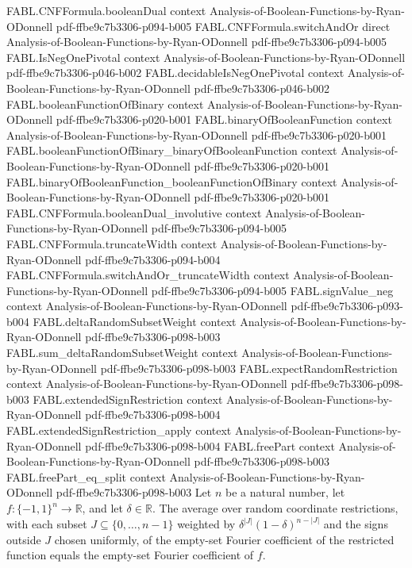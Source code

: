 \begin{theorem}
\proofstep
  {FABL.CNFFormula.booleanDual}
  {context}
  {Analysis-of-Boolean-Functions-by-Ryan-ODonnell}
  {pdf-ffbe9c7b3306-p094-b005}
\proofstep
  {FABL.CNFFormula.switchAndOr}
  {direct}
  {Analysis-of-Boolean-Functions-by-Ryan-ODonnell}
  {pdf-ffbe9c7b3306-p094-b005}
\proofstep
  {FABL.IsNegOnePivotal}
  {context}
  {Analysis-of-Boolean-Functions-by-Ryan-ODonnell}
  {pdf-ffbe9c7b3306-p046-b002}
\proofstep
  {FABL.decidableIsNegOnePivotal}
  {context}
  {Analysis-of-Boolean-Functions-by-Ryan-ODonnell}
  {pdf-ffbe9c7b3306-p046-b002}
\proofstep
  {FABL.booleanFunctionOfBinary}
  {context}
  {Analysis-of-Boolean-Functions-by-Ryan-ODonnell}
  {pdf-ffbe9c7b3306-p020-b001}
\proofstep
  {FABL.binaryOfBooleanFunction}
  {context}
  {Analysis-of-Boolean-Functions-by-Ryan-ODonnell}
  {pdf-ffbe9c7b3306-p020-b001}
\proofstep
  {FABL.booleanFunctionOfBinary_binaryOfBooleanFunction}
  {context}
  {Analysis-of-Boolean-Functions-by-Ryan-ODonnell}
  {pdf-ffbe9c7b3306-p020-b001}
\proofstep
  {FABL.binaryOfBooleanFunction_booleanFunctionOfBinary}
  {context}
  {Analysis-of-Boolean-Functions-by-Ryan-ODonnell}
  {pdf-ffbe9c7b3306-p020-b001}
\proofstep
  {FABL.CNFFormula.booleanDual_involutive}
  {context}
  {Analysis-of-Boolean-Functions-by-Ryan-ODonnell}
  {pdf-ffbe9c7b3306-p094-b005}
\proofstep
  {FABL.CNFFormula.truncateWidth}
  {context}
  {Analysis-of-Boolean-Functions-by-Ryan-ODonnell}
  {pdf-ffbe9c7b3306-p094-b004}
\proofstep
  {FABL.CNFFormula.switchAndOr_truncateWidth}
  {context}
  {Analysis-of-Boolean-Functions-by-Ryan-ODonnell}
  {pdf-ffbe9c7b3306-p094-b005}
\proofstep
  {FABL.signValue_neg}
  {context}
  {Analysis-of-Boolean-Functions-by-Ryan-ODonnell}
  {pdf-ffbe9c7b3306-p093-b004}
\proofstep
  {FABL.deltaRandomSubsetWeight}
  {context}
  {Analysis-of-Boolean-Functions-by-Ryan-ODonnell}
  {pdf-ffbe9c7b3306-p098-b003}
\proofstep
  {FABL.sum_deltaRandomSubsetWeight}
  {context}
  {Analysis-of-Boolean-Functions-by-Ryan-ODonnell}
  {pdf-ffbe9c7b3306-p098-b003}
\proofstep
  {FABL.expectRandomRestriction}
  {context}
  {Analysis-of-Boolean-Functions-by-Ryan-ODonnell}
  {pdf-ffbe9c7b3306-p098-b003}
\proofstep
  {FABL.extendedSignRestriction}
  {context}
  {Analysis-of-Boolean-Functions-by-Ryan-ODonnell}
  {pdf-ffbe9c7b3306-p098-b004}
\proofstep
  {FABL.extendedSignRestriction_apply}
  {context}
  {Analysis-of-Boolean-Functions-by-Ryan-ODonnell}
  {pdf-ffbe9c7b3306-p098-b004}
\proofstep
  {FABL.freePart}
  {context}
  {Analysis-of-Boolean-Functions-by-Ryan-ODonnell}
  {pdf-ffbe9c7b3306-p098-b003}
\proofstep
  {FABL.freePart_eq_split}
  {context}
  {Analysis-of-Boolean-Functions-by-Ryan-ODonnell}
  {pdf-ffbe9c7b3306-p098-b003}
Let $n$ be a natural number, let $f:\{-1,1\}^n\to\mathbb R$, and let $\delta\in\mathbb
R$. The average over random coordinate restrictions, with each subset
$J\subseteq\{0,\ldots,n-1\}$ weighted by $\delta^{|J|}(1-\delta)^{n-|J|}$ and the signs
outside $J$ chosen uniformly, of the empty-set Fourier coefficient of the restricted
function equals the empty-set Fourier coefficient of $f$.
\end{theorem}

